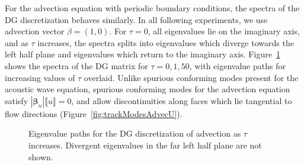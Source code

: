 \documentclass[preprint,10pt]{elsarticle}
\newcommand{\LRb}[1]{\left| #1 \right|}
\newcommand{\jump}[1] {\ensuremath{\llbracket#1\rrbracket}}
\begin{document}

For the advection equation with periodic boundary conditions, the spectra of the DG discretization behaves similarly.  In all following experiments, we use advection vector $\beta = (1,0)$.  For $\tau=0$, all eigenvalues lie on the imaginary axis, and as $\tau$ increases, the spectra splits into eigenvalues which diverge towards the left half plane and eigenvalues which return to the imaginary axis.  Figure~\ref{fig:trackModesAdvec} shows the spectra of the DG matrix for $\tau = 0,1,50$, with eigenvalue paths for increasing values of $\tau$ overlaid.  Unlike spurious conforming modes present for the acoustic wave equation, spurious conforming modes for the advection equation satisfy $\LRb{\bm{\beta}_n}\jump{ u} = 0$, and allow discontinuities along faces which lie tangential to flow directions (Figure~\ref{fig:trackModesAdvecU}).  


\begin{figure}
\centering
{}
\hspace{.5em}
\caption{Eigenvalue paths for the DG discretization of advection as $\tau$ increases.  Divergent eigenvalues in the far left half plane are not shown.  }
\label{fig:trackModesAdvec}
\end{figure}
\end{document}
